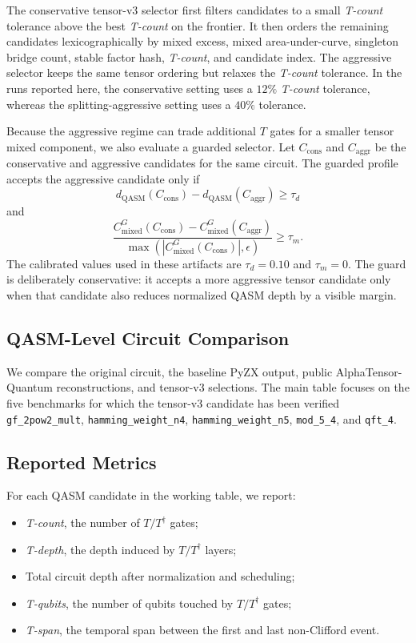 \documentclass[conference]{IEEEtran}
\newcommand{\atq}{AlphaTensor-Quantum}
\newcommand{\tcount}{\textit{T-count}}
\newcommand{\tdepth}{\textit{T-depth}}
\newcommand{\tdag}{T^{\dagger}}
\newcommand{\tspan}{\textit{T-span}}
\newcommand{\tqubits}{\textit{T-qubits}}
\newcommand{\Cmixed}{C_{\mathrm{mixed}}}
\begin{document}
The conservative tensor-v3 selector first filters candidates to a small \tcount{} tolerance above the best \tcount{} on the frontier. It then orders the remaining candidates lexicographically by mixed excess, mixed area-under-curve, singleton bridge count, stable factor hash, \tcount{}, and candidate index. The aggressive selector keeps the same tensor ordering but relaxes the \tcount{} tolerance. In the runs reported here, the conservative setting uses a $12\%$ \tcount{} tolerance, whereas the splitting-aggressive setting uses a $40\%$ tolerance.

Because the aggressive regime can trade additional $T$ gates for a smaller tensor mixed component, we also evaluate a guarded selector. Let $C_{\mathrm{cons}}$ and $C_{\mathrm{aggr}}$ be the conservative and aggressive candidates for the same circuit. The guarded profile accepts the aggressive candidate only if
\begin{equation}
d_{\mathrm{QASM}}(C_{\mathrm{cons}})
-
d_{\mathrm{QASM}}(C_{\mathrm{aggr}})
\geq
\tau_d
\end{equation}
and
\begin{equation}
\frac{\Cmixed^G(C_{\mathrm{cons}})-\Cmixed^G(C_{\mathrm{aggr}})}
{\max(|\Cmixed^G(C_{\mathrm{cons}})|,\epsilon)}
\geq
\tau_m.
\end{equation}
The calibrated values used in these artifacts are $\tau_d=0.10$ and $\tau_m=0$. The guard is deliberately conservative: it accepts a more aggressive tensor candidate only when that candidate also reduces normalized QASM depth by a visible margin.

\subsection{QASM-Level Circuit Comparison}

We compare the original circuit, the baseline PyZX output, public \atq{} reconstructions, and tensor-v3 selections. The main table focuses on the five benchmarks for which the tensor-v3 candidate has been verified 
\texttt{gf\_2pow2\_mult},
\texttt{hamming\_weight\_n4},
\texttt{hamming\_weight\_n5},
\texttt{mod\_5\_4},
and \texttt{qft\_4}.



\subsection{Reported Metrics}

For each QASM candidate in the working table, we report:
\begin{itemize}
    \item \tcount{}, the number of $T/\tdag$ gates;
    \item \tdepth{}, the depth induced by $T/\tdag$ layers;
    \item Total circuit depth after normalization and scheduling;
    \item \tqubits{}, the number of qubits touched by $T/\tdag$ gates;
    \item \tspan{}, the temporal span between the first and last non-Clifford event.
\end{itemize}
\end{document}
